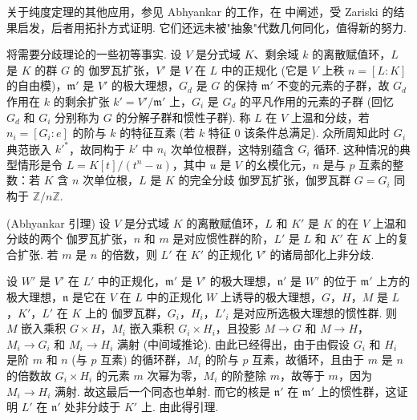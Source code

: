 \begin{remark}\label{rem:X.3.5}
关于纯度定理的其他应用，参见 Abhyankar 的工作，在 \cite{exp10-4} 中阐述，受 Zariski \cite[第八章]{exp10-6} 的结果启发，后者用拓扑方式证明. 它们还远未被"抽象"代数几何同化，值得新的努力.
\end{remark}

将需要分歧理论的一些初等事实. 设 $V$ 是分式域 $K$、剩余域 $k$ 的离散赋值环，$L$ 是 $K$ 的群 $G$ 的 伽罗瓦扩张，$V'$ 是 $V$ 在 $L$ 中的正规化 (它是 $V$ 上秩 $n = [L : K]$ 的自由模)，$\mathfrak{m}'$ 是 $V'$ 的极大理想，$G_d$ 是 $G$ 的保持 $\mathfrak{m}'$ 不变的元素的子群，故 $G_d$ 作用在 $k$ 的剩余扩张 $k' = V'/\mathfrak{m}'$ 上，$G_i$ 是 $G_d$ 的平凡作用的元素的子群 (回忆 $G_d$ 和 $G_i$ 分别称为 $G$ 的分解子群和惯性子群). 称 $L$ 在 $V$ 上温和分歧，若 $n_i = [G_i : e]$ 的阶与 $k$ 的特征互素 (若 $k$ 特征 0 该条件总满足). 众所周知此时 $G_i$ 典范嵌入 $k'^{*}$，故同构于 $k'$ 中 $n_i$ 次单位根群，这特别蕴含 $G_i$ 循环. 这种情况的典型情形是令 $L = K[t]/(t^n - u)$，其中 $u$ 是 $V$ 的幺模化元，$n$ 是与 $p$ 互素的整数：若 $K$ 含 $n$ 次单位根，$L$ 是 $K$ 的完全分歧 伽罗瓦扩张，伽罗瓦群 $G = G_i$ 同构于 $\mathbb{Z}/n\mathbb{Z}$.

\begin{lemma}\label{lem:X.3.6}
(Abhyankar 引理) 设 $V$ 是分式域 $K$ 的离散赋值环，$L$ 和 $K'$ 是 $K$ 的在 $V$ 上温和分歧的两个 伽罗瓦扩张，$n$ 和 $m$ 是对应惯性群的阶，$L'$ 是 $L$ 和 $K'$ 在 $K$ 上的复合扩张. 若 $m$ 是 $n$ 的倍数，则 $L'$ 在 $K'$ 的正规化 $V'$ 的诸局部化上非分歧.
\end{lemma}

设 $W'$ 是 $V'$ 在 $L'$ 中的正规化，$\mathfrak{m}'$ 是 $V'$ 的极大理想，$\mathfrak{n}'$ 是 $W'$ 的位于 $\mathfrak{m}'$ 上方的极大理想，$\mathfrak{n}$ 是它在 $V$ 在 $L$ 中的正规化 $W$ 上诱导的极大理想，$G$，$H$，$M$ 是 $L$，$K'$，$L'$ 在 $K$ 上的 伽罗瓦群，$G_i$，$H_i$，$L'_i$ 是对应所选极大理想的惯性群. 则 $M$ 嵌入乘积 $G \times H$，$M_i$ 嵌入乘积 $G_i \times H_i$，且投影 $M \to G$ 和 $M \to H$，$M_i \to G_i$ 和 $M_i \to H_i$ 满射 (中间域推论). 由此已经得出，由于由假设 $G_i$ 和 $H_i$ 是阶 $m$ 和 $n$ (与 $p$ 互素) 的循环群，$M_i$ 的阶与 $p$ 互素，故循环，且由于 $m$ 是 $n$ 的倍数故 $G_i \times H_i$ 的元素 $m$ 次幂为零，$M_i$ 的阶整除 $m$，故等于 $m$，因为 $M_i \to H_i$ 满射. 故这最后一个同态也单射. 而它的核是 $\mathfrak{n}'$ 在 $\mathfrak{m}'$ 上的惯性群，这证明 $L'$ 在 $\mathfrak{n}'$ 处非分歧于 $K'$ 上. 由此得引理.

